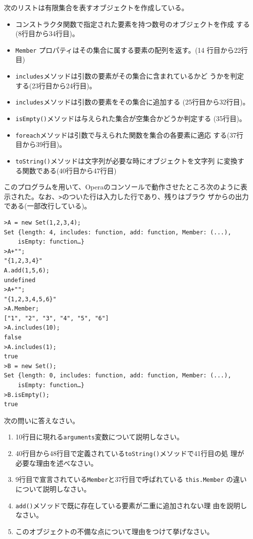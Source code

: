 \documentclass[a4j,12pt]{jreport}
\begin{document}
   \begin{Prob}\upshape
    次のリストは有限集合を表すオブジェクトを作成している。
   {\small
    }
\begin{itemize}
 \item コンストラクタ関数で指定された要素を持つ数号のオブジェクトを作成
       する(8行目から34行目)。
 \item \texttt{Member} プロパティはその集合に属する要素の配列を返す。(14
       行目から22行目)
 \item \texttt{includes}メソッドは引数の要素がその集合に含まれているかど
       うかを判定する(23行目から24行目)。
 \item \texttt{includes}メソッドは引数の要素をその集合に追加する
       (25行目から32行目)。
 \item \verb+isEmpty()+メソッドは与えられた集合が空集合かどうか判定する
       (35行目)。
 \item \verb+foreach+メソッドは引数で与えられた関数を集合の各要素に適応
       する(37行目から39行目)。
 \item \verb+toString()+メソッドは文字列が必要な時にオブジェクトを文字列
       に変換する関数である(40行目から47行目)
\end{itemize}
 このプログラムを用いて、Operaのコンソールで動作させたところ次のように表
    示された。なお、\texttt{>}のついた行は入力した行であり、残りはブラウ
    ザからの出力である(一部改行している)。
    {\small
\begin{verbatim}
>A = new Set(1,2,3,4);
Set {length: 4, includes: function, add: function, Member: (...),
	isEmpty: function…}
>A+"";
"{1,2,3,4}"
A.add(1,5,6);
undefined
>A+"";
"{1,2,3,4,5,6}"
>A.Member;
["1", "2", "3", "4", "5", "6"]
>A.includes(10);
false
>A.includes(1);
true
>B = new Set();
Set {length: 0, includes: function, add: function, Member: (...),
	isEmpty: function…}
>B.isEmpty();
true
\end{verbatim}
}
次の問いに答えなさい。
\begin{enumerate}
 \item 10行目に現れる\texttt{arguments}変数について説明しなさい。\\[2cm]
 \item 40行目から48行目で定義されている\verb+toString()+メソッドで41行目の処
       理が必要な理由を述べなさい。\\[2cm]
 \item 9行目で宣言されている\verb+Member+と37行目で呼ばれている
       \verb+this.Member+ の違いについて説明しなさい。\\[2cm]
 \item \verb+add()+メソッドで既に存在している要素が二重に追加されない理
       由を説明しなさい。\\[3cm]
 \item このオブジェクトの不備な点について理由をつけて挙げなさい。
\end{enumerate}
 \end{Prob}\newpage
\end{document}
